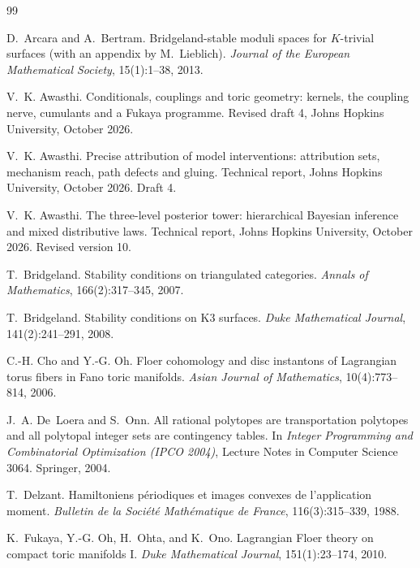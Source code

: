 \documentclass[11pt]{article}
\theoremstyle{definition}
\theoremstyle{remark}
\begin{document}
\begin{thebibliography}{99}

D.~Arcara and A.~Bertram.
\newblock Bridgeland-stable moduli spaces for {$K$}-trivial surfaces (with an appendix by M.~Lieblich).
\newblock \emph{Journal of the European Mathematical Society}, 15(1):1--38, 2013.

V.~K. Awasthi.
\newblock Conditionals, couplings and toric geometry: kernels, the coupling nerve, cumulants and a {F}ukaya
programme.
\newblock Revised draft 4, Johns Hopkins University, October 2026.

V.~K. Awasthi.
\newblock Precise attribution of model interventions: attribution sets, mechanism reach, path defects
and gluing.
\newblock Technical report, Johns Hopkins University, October 2026. Draft 4.

V.~K. Awasthi.
\newblock The three-level posterior tower: hierarchical {B}ayesian inference and mixed distributive laws.
\newblock Technical report, Johns Hopkins University, October 2026. Revised version 10.

T.~Bridgeland.
\newblock Stability conditions on triangulated categories.
\newblock \emph{Annals of Mathematics}, 166(2):317--345, 2007.

T.~Bridgeland.
\newblock Stability conditions on {K}3 surfaces.
\newblock \emph{Duke Mathematical Journal}, 141(2):241--291, 2008.

C.-H. Cho and Y.-G. Oh.
\newblock Floer cohomology and disc instantons of {L}agrangian torus fibers in {F}ano toric manifolds.
\newblock \emph{Asian Journal of Mathematics}, 10(4):773--814, 2006.

J.~A. De~Loera and S.~Onn.
\newblock All rational polytopes are transportation polytopes and all polytopal integer sets are contingency
tables.
\newblock In \emph{Integer Programming and Combinatorial Optimization (IPCO 2004)}, Lecture Notes in Computer
Science 3064. Springer, 2004.

T.~Delzant.
\newblock Hamiltoniens p\'eriodiques et images convexes de l'application moment.
\newblock \emph{Bulletin de la Soci\'et\'e Math\'ematique de France}, 116(3):315--339, 1988.

K.~Fukaya, Y.-G. Oh, H.~Ohta, and K.~Ono.
\newblock Lagrangian {F}loer theory on compact toric manifolds {I}.
\newblock \emph{Duke Mathematical Journal}, 151(1):23--174, 2010.


\end{thebibliography}
\end{document}
